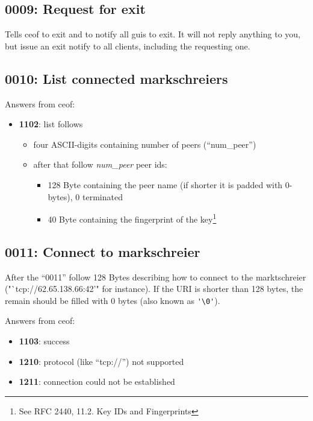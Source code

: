 \documentclass[12pt,a4paper]{book}
\begin{document}
\subsection{0009: Request for exit}
Tells ceof to exit and to notify all guis to exit.
It will not reply anything to you, but issue an exit notify to all clients,
including the requesting one.
\subsection{0010: List connected markschreiers}
Answers from ceof:
\begin{itemize}
\item \textbf{1102}: list follows
\begin{itemize}
\item four ASCII-digits containing number of peers ("`num\_peer"')
\item after that follow \textit{num\_peer} peer ids:
\begin{itemize}
\item 128 Byte containing the peer name (if shorter it is padded with 0-bytes), 0 terminated
\item 40 Byte containing the fingerprint of the
key\footnote{See RFC 2440, 11.2. Key IDs and Fingerprints}
\end{itemize}
\end{itemize}
\end{itemize}
\subsection{0011: Connect to markschreier}
After the "`0011"' follow 128 Bytes describing how to connect
to the marktschreier ("`tcp://62.65.138.66:42'" for instance).
If the URI is shorter than 128 bytes, the remain should be filled with 0 bytes
(also known as \verb='\0'=).

Answers from ceof:
\begin{itemize}
\item \textbf{1103}: success
\item \textbf{1210}: protocol (like "`tcp://"') not supported
\item \textbf{1211}: connection could not be established
\end{itemize}
\end{document}
